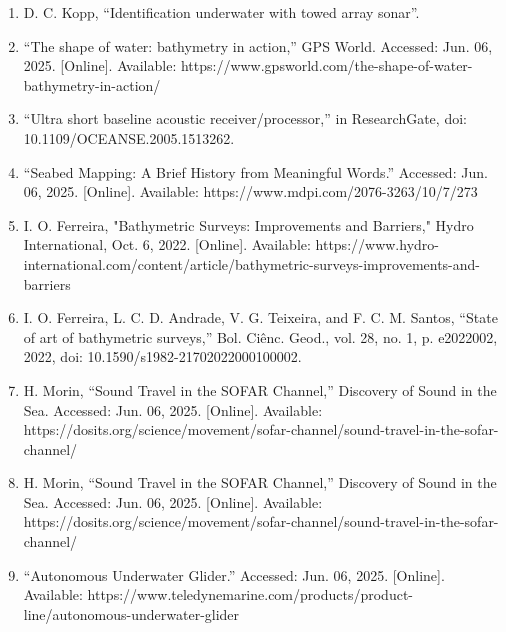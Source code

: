 \documentclass{article}
\begin{document}
\begin{enumerate}
    \item{D. C. Kopp, “Identification underwater with towed array sonar”.}

    \item{“The shape of water: bathymetry in action,” GPS World. Accessed: Jun. 06, 2025. [Online]. Available: https://www.gpsworld.com/the-shape-of-water-bathymetry-in-action/}


    \item{“Ultra short baseline acoustic receiver/processor,” in ResearchGate, doi: 10.1109/OCEANSE.2005.1513262.}

    \item{“Seabed Mapping: A Brief History from Meaningful Words.” Accessed: Jun. 06, 2025. [Online]. Available: https://www.mdpi.com/2076-3263/10/7/273}

    \item{I. O. Ferreira, "Bathymetric Surveys: Improvements and Barriers," Hydro International, Oct. 6, 2022. [Online]. Available: https://www.hydro-international.com/content/article/bathymetric-surveys-improvements-and-barriers}

    \item{I. O. Ferreira, L. C. D. Andrade, V. G. Teixeira, and F. C. M. Santos, “State of art of bathymetric surveys,” Bol. Ciênc. Geod., vol. 28, no. 1, p. e2022002, 2022, doi: 10.1590/s1982-21702022000100002.}

    \item{H. Morin, “Sound Travel in the SOFAR Channel,” Discovery of Sound in the Sea. Accessed: Jun. 06, 2025. [Online]. Available: https://dosits.org/science/movement/sofar-channel/sound-travel-in-the-sofar-channel/}

    \item{H. Morin, “Sound Travel in the SOFAR Channel,” Discovery of Sound in the Sea. Accessed: Jun. 06, 2025. [Online]. Available: https://dosits.org/science/movement/sofar-channel/sound-travel-in-the-sofar-channel/}

    \item{“Autonomous Underwater Glider.” Accessed: Jun. 06, 2025. [Online]. Available: https://www.teledynemarine.com/products/product-line/autonomous-underwater-glider}

\end{enumerate}

\end{document}
